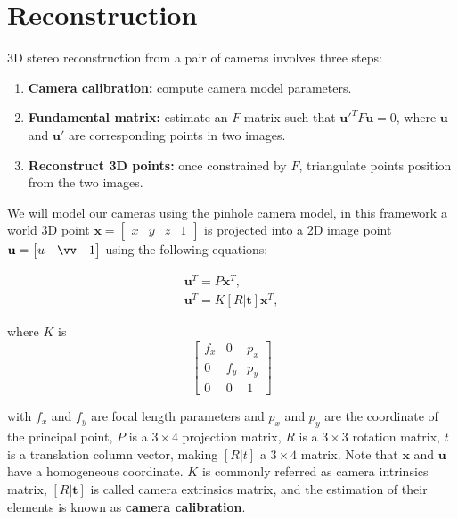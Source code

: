 \documentclass[12pt]{article}
\begin{document}
\FloatBarrier
\section{Reconstruction}

3D stereo reconstruction from a pair of cameras involves three steps:
\begin{enumerate}
\item \textbf{Camera calibration:} compute camera model parameters.
\item \textbf{Fundamental matrix:} estimate an $F$ matrix such that $\mathbf{u}'^TF\mathbf{u} = 0$, where $\mathbf{u}$ and $\mathbf{u}'$ are corresponding points in two images.
\item \textbf{Reconstruct 3D points:} once constrained by $F$, triangulate points position from the two images.
\end{enumerate}

We will model our cameras using the pinhole camera model, in this framework a world 3D point $\mathbf{x} = \begin{bmatrix} x & y & z & 1 \end{bmatrix}$ is projected into a 2D image point $\mathbf{u} = \begin{bmatrix} u & \vv & 1 \end{bmatrix}$ using the following equations:

\begin{gather}
	\mathbf{u}^T = P \mathbf{x}^T, \label{eq:matrixP} \\
	\mathbf{u}^T = K [R | \mathbf{t}] \mathbf{x}^T, \label{eq:matrixRT}
\end{gather}

where $K$ is 
\begin{equation}
\begin{bmatrix}
f_x & 0 & p_x \\ 
0 & f_y & p_y \\ 
0 & 0 & 1
\end{bmatrix}
\end{equation}

with $f_x$ and $f_y$ are focal length parameters and $p_x$ and $p_y$ are the coordinate of the principal point, $P$ is a $3 \times 4$ projection matrix, $R$ is a $3 \times 3$ rotation matrix, $t$ is a translation column vector, making $[R|t]$ a $3 \times 4$ matrix.
Note that $\mathbf{x}$ and $\mathbf{u}$ have a homogeneous coordinate.
$K$ is commonly referred as camera intrinsics matrix, $[R|\mathbf{t}]$ is called camera extrinsics matrix, and the estimation of their elements is known as \textbf{camera calibration}.
\end{document}
